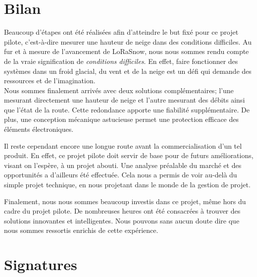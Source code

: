 \section{Bilan}

Beaucoup d'étapes ont été réalisées afin d'atteindre le but fixé pour ce projet pilote, c'est-à-dire 
mesurer une hauteur de neige dans des conditions difficiles. Au fur et à mesure de l'avancement de LoRaSnow,
nous nous sommes rendu compte de la vraie signification de \emph{conditions difficiles}. En effet, faire 
fonctionner des systèmes dans un froid glacial, du vent et de la neige est un défi qui demande des
ressources et de l'imagination.\\
Nous sommes finalement arrivés avec deux solutions complémentaires; l'une mesurant directement une hauteur 
de neige et l'autre mesurant des débits ainsi que l'état de la route. Cette redondance apporte une fiabilité
supplémentaire. De plus, une conception mécanique astucieuse permet une protection efficace des éléments 
électroniques.\par 
Il reste cependant encore une longue route avant la commercialisation d'un tel produit. En effet, ce projet 
pilote doit servir de base pour de futurs améliorations, visant on l'espère, à un projet abouti. Une analyse
préalable du marché et des opportunités a d'ailleurs été effectuée. Cela nous a permis de voir au-delà du
simple projet technique, en nous projetant dans le monde de la gestion de projet.\par 
Finalement, nous nous sommes beaucoup investis dans ce projet, même hors du cadre du projet pilote. De 
nombreuses heures ont été consacrées à trouver des solutions innovantes et intelligentes. Nous pouvons sans 
aucun doute dire que nous sommes ressortis enrichis de cette expérience.

\section{Signatures}
